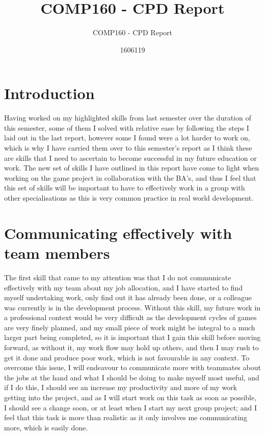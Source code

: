 \documentclass{scrartcl}
\title{COMP160 - CPD Report}
\subtitle{COMP160 - CPD Report}
\author{1606119}
\begin{document}
\maketitle

\section{Introduction}
Having worked on my highlighted skills from last semester over the duration of this semester, some of them I solved with relative ease by following the steps I laid out in the last report, however some I found were a lot harder to work on, which is why I have carried them over to this semester's report as I think these are skills that I need to ascertain to become successful in my future education or work. The new set of skills I have outlined in this report have come to light when working on the game project in collaboration with the BA's, and thus I feel that this set of skills will be important to have to effectively work in a group with other specialisations as this is very common practice in real world development. 


\section{Communicating effectively with team members}
The first skill that came to my attention was that I do not communicate effectively with my team about my job allocation, and I have started to find myself undertaking work, only find out it has already been done, or a colleague was currently is in the development process. Without this skill, my future work in a professional context would be very difficult as the development cycles of games are very finely planned, and my small piece of work might be integral to a much larger part being completed, so it is important that I gain this skill before moving forward, as without it, my work flow may hold up others, and then I may rush to get it done and produce poor work, which is not favourable in any context. To overcome this issue, I will endeavour to communicate more with teammates about the jobs at the hand and what I should be doing to make myself most useful, and if I do this, I should see an increase my productivity and more of my work getting into the project, and as I will start work on this task as soon as possible, I should see a change soon, or at least when I start my next group project; and I feel that this task is more than realistic as it only involves me communicating more, which is easily done. 
\end{document}
